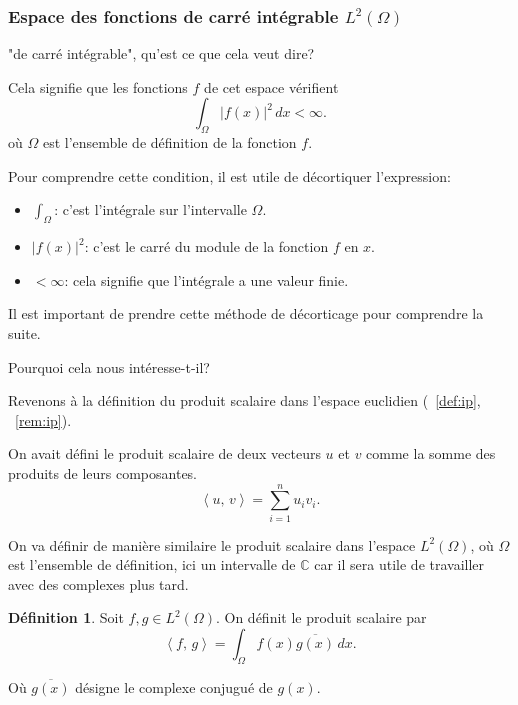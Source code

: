 \documentclass[11pt,a4paper]{article}
\numberwithin{equation}{section}
\theoremstyle{plain}
\theoremstyle{definition}
\newtheorem{definition}[theorem]{Définition}
\theoremstyle{remark}
\newcommand{\C}{\mathbb{C}}
\newcommand{\ip}[2]{\left\langle #1,\, #2\right\rangle}
\begin{document}
\subsubsection{Espace des fonctions de carré intégrable $L^2(\Omega)$}

"de carré intégrable", qu'est ce que cela veut dire?

Cela signifie que les fonctions $f$ de cet espace vérifient
\[
    \int_\Omega |f(x)|^2 \, dx < \infty.
\]
où $\Omega$ est l'ensemble de définition de la fonction $f$.
\begin{indication}
    Pour comprendre cette condition, il est utile de décortiquer l'expression:
    \begin{itemize}
        \item $\int_{\Omega}$: c'est l'intégrale sur l'intervalle $\Omega$. 
        \item $|f(x)|^2$: c'est le carré du module de la fonction $f$ en $x$. 
        \item $< \infty$: cela signifie que l'intégrale a une valeur finie.
    \end{itemize}
    Il est important de prendre cette méthode de décorticage pour comprendre la suite.
\end{indication}

Pourquoi cela nous intéresse-t-il?

Revenons à la définition du produit scalaire dans l'espace euclidien (~\ref{def:ip}, ~\ref{rem:ip}).

On avait défini le produit scalaire de deux vecteurs $u$ et $v$ comme la somme des produits de leurs composantes.
\[
    \ip{u}{v} = \sum_{i=1}^n u_i v_i.
\]

On va définir de manière similaire le produit scalaire dans l'espace $L^2(\Omega)$, où $\Omega$ est l'ensemble de définition, ici un intervalle de $\C$ car il sera utile de travailler avec des complexes plus tard.

\begin{definition} \label{def:ip_L2}
    Soit $f,g \in L^2(\Omega)$. On définit le produit scalaire par
    \[
        \ip{f}{g} = \int_\Omega f(x) \overline{g(x)} \, dx.
    \]
\end{definition}

Où $\overline{g(x)}$ désigne le complexe conjugué de $g(x)$.
\end{document}

